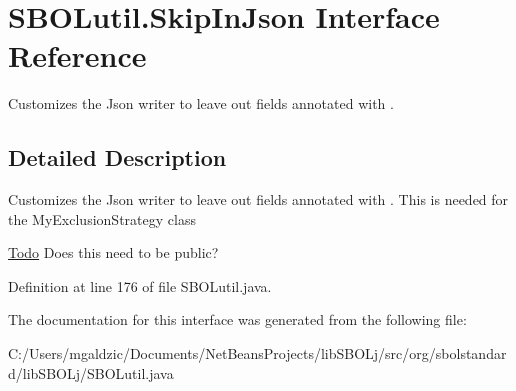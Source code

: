 \hypertarget{interfaceorg_1_1sbolstandard_1_1lib_s_b_o_lj_1_1_s_b_o_lutil_1_1_skip_in_json}{
\section{SBOLutil.SkipInJson Interface Reference}
\label{interfaceorg_1_1sbolstandard_1_1lib_s_b_o_lj_1_1_s_b_o_lutil_1_1_skip_in_json}
}


Customizes the Json writer to leave out fields annotated with .  




\subsection{Detailed Description}
Customizes the Json writer to leave out fields annotated with . This is needed for the MyExclusionStrategy class \begin{Desc}
\item[\hyperlink{todo__todo000007}{Todo}]Does this need to be public?\end{Desc}


Definition at line 176 of file SBOLutil.java.



The documentation for this interface was generated from the following file:\begin{DoxyCompactItemize}
\item 
C:/Users/mgaldzic/Documents/NetBeansProjects/libSBOLj/src/org/sbolstandard/libSBOLj/SBOLutil.java\end{DoxyCompactItemize}
